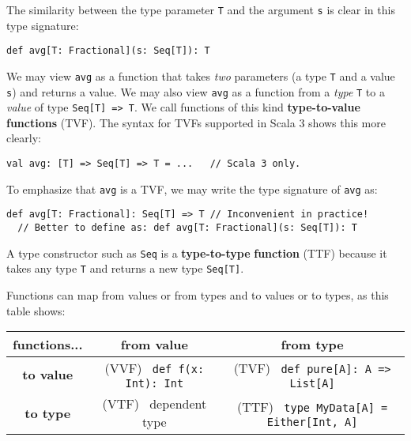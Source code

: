 The similarity between the type parameter \lstinline!T! and the argument
\lstinline!s! is clear in this type signature:
\begin{lstlisting}
def avg[T: Fractional](s: Seq[T]): T
\end{lstlisting}
\begin{comment}
def avg{[}T: Fractional{]}(s : Seq{[}T{]}): T = \{

val frac = implicitly{[}Fractional{[}T{]}{]}

frac.div(s.sum, frac.fromInt(s.length)) 

\}
\end{comment}
We may view \lstinline!avg! as a function that takes \emph{two} parameters
(a type \lstinline!T! and a value \lstinline!s!) and returns a value.
We may also view \lstinline!avg! as a function from a \emph{type}
\lstinline!T! to a \emph{value} of type \lstinline!Seq[T] => T!.
We call functions of this kind \textbf{type-to-value}
\textbf{functions} (TVF). The syntax for TVFs supported in Scala 3
shows this more clearly:
\begin{lstlisting}
val avg: [T] => Seq[T] => T = ...   // Scala 3 only.
\end{lstlisting}
To emphasize that \lstinline!avg! is a TVF, we may write the type
signature of \lstinline!avg! as:
\begin{lstlisting}
def avg[T: Fractional]: Seq[T] => T // Inconvenient in practice!
  // Better to define as: def avg[T: Fractional](s: Seq[T]): T
\end{lstlisting}

A type constructor such as \lstinline!Seq! is a \textbf{type-to-type}
\textbf{function} (TTF) because it takes any type \lstinline!T! and
returns a new type \lstinline!Seq[T]!.

Functions can map from values or from types and to values or to types,
as this table shows:
\begin{center}
\begin{tabular}{|c|c|c|}
\hline 
\textbf{\small{}functions...} & \textbf{\small{}from value} & \textbf{\small{}from type}\tabularnewline
\hline 
\hline 
\textbf{\small{}to value} & {\small{}(VVF)~ }\lstinline!def f(x: Int): Int! & {\small{}(TVF)~ }\lstinline!def pure[A]: A => List[A]!\tabularnewline
\hline 
\textbf{\small{}to type} & {\small{}(VTF)~ dependent type} & {\small{}(TTF)~ }\lstinline!type MyData[A] = Either[Int, A]!\tabularnewline
\hline 
\end{tabular}
\par\end{center}

